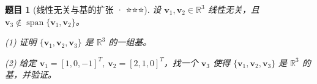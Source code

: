 \documentclass[12pt]{ctexart}
\newtheorem{problem}{题目}
\begin{document}






\begin{problem}[线性无关与基的扩张 · ⭐⭐⭐]
设 $\mathbf{v}_1, \mathbf{v}_2 \in \mathbb{R}^3$ 线性无关，且 $\mathbf{v}_3 \notin \operatorname{span}\{\mathbf{v}_1, \mathbf{v}_2\}$。

(1) 证明 $\{\mathbf{v}_1, \mathbf{v}_2, \mathbf{v}_3\}$ 是 $\mathbb{R}^3$ 的一组基。

(2) 给定 $\mathbf{v}_1 = [1, 0, -1]^T$, $\mathbf{v}_2 = [2, 1, 0]^T$，找一个 $\mathbf{v}_3$ 使得 $\{\mathbf{v}_1, \mathbf{v}_2, \mathbf{v}_3\}$ 是 $\mathbb{R}^3$ 的基，并验证。
\end{problem}




\end{document}
